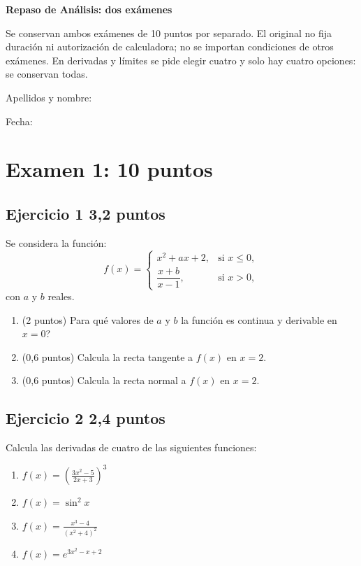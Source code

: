 \documentclass[11pt]{article}
\begin{document}
{\Large\bfseries Repaso de Análisis: dos exámenes}

Se conservan ambos exámenes de 10 puntos por separado. El original no fija duración ni autorización de calculadora; no se importan condiciones de otros exámenes. En derivadas y límites se pide elegir cuatro y solo hay cuatro opciones: se conservan todas.

Apellidos y nombre: \hrulefill

Fecha: \hrulefill


\section*{Examen 1: 10 puntos}
\subsection*{Ejercicio 1 \hfill 3,2 puntos} Se considera la función:
\[
f(x) =
\begin{cases} 
x^2 + ax + 2, & \text{si } x \leq 0, \\
\dfrac{x + b}{x - 1}, & \text{si } x > 0,
\end{cases}
\]
con \( a \) y \( b \) reales.

\begin{enumerate}[label=(\alph*)]
\item (2 puntos)  \textquestiondown{}Para qué valores de \(a\) y \(b\) la función es continua y derivable en \(x = 0\)?



\item (0,6 puntos)  Calcula la recta tangente a \( f(x) \) en \( x = 2 \).



\item (0,6 puntos)  Calcula la recta normal a \( f(x) \) en \( x = 2 \).



\end{enumerate}

\subsection*{Ejercicio 2 \hfill 2,4 puntos} Calcula las derivadas de cuatro de las siguientes funciones:


\begin{enumerate}[label=(\alph*)]
\item \( f(x) = \left( \frac{3x^2 - 5}{2x + 3} \right)^3 \)



\item \( f(x) = \sin^2{x} \)



\item \( f(x) = \frac{x^3 - 4}{(x^2 + 4)^2} \)



\item \( f(x) = e^{3x^2 - x + 2} \)


\end{enumerate}
\end{document}
